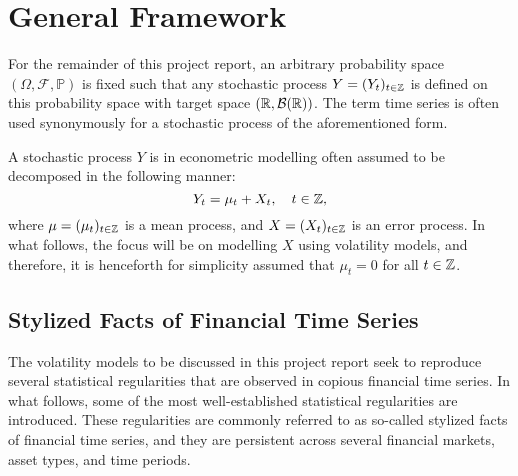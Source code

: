 \section{General Framework}\label{sec:gf}
For the remainder of this project report, an arbitrary probability space $(\Omega,\mathcal{F},\mathbb{P})$ is fixed such that any stochastic process $Y=(Y_{t})_{t\in\mathbb{Z}}$ is defined on this probability space with target space $(\mathbb{R},\mathcal{B}(\mathbb{R}))$. The term time series is often used synonymously for a stochastic process of the aforementioned form. 

A stochastic process $Y$ is in econometric modelling often assumed to be decomposed in the following manner:
\begin{equation}
    Y_{t}=\mu_{t}+X_{t},\quad t\in\mathbb{Z},
\end{equation}
where $\mu=(\mu_{t})_{t\in\mathbb{Z}}$ is a mean process, and $X=(X_{t})_{t\in\mathbb{Z}}$ is an error process. In what follows, the focus will be on modelling $X$ using volatility models, and therefore, it is henceforth for simplicity assumed that $\mu_{t}=0$ for all $t\in\mathbb{Z}$.

\subsection{Stylized Facts of Financial Time Series}\label{fedpik}
The volatility models to be discussed in this project report seek to reproduce several statistical regularities that are observed in copious financial time series. In what follows, some of the most well-established statistical regularities are introduced. These regularities are commonly referred to as so-called stylized facts of financial time series, and they are persistent across several financial markets, asset types, and time periods.

